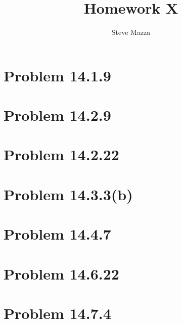 \documentclass[letterpaper,10pt]{article}
\title{Homework X}
\author{Steve Mazza}
\begin{document}
\maketitle

\section*{Problem 14.1.9}

\section*{Problem 14.2.9}

\section*{Problem 14.2.22}

\section*{Problem 14.3.3(b)}

\section*{Problem 14.4.7}

\section*{Problem 14.6.22}

\section*{Problem 14.7.4}
\end{document}

